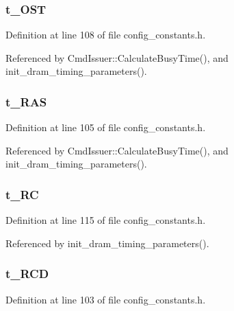 \subsubsection[{t\_\-OST}]{ {\bf t\_\-OST}}\label{config__constants_8h_635df1de31d54e4cb8777583366f4557}




Definition at line 108 of file config\_\-constants.h.

Referenced by CmdIssuer::CalculateBusyTime(), and init\_\-dram\_\-timing\_\-parameters().
\subsubsection[{t\_\-RAS}]{ {\bf t\_\-RAS}}\label{config__constants_8h_922b63d06cf57b48a984342835b4e871}




Definition at line 105 of file config\_\-constants.h.

Referenced by CmdIssuer::CalculateBusyTime(), and init\_\-dram\_\-timing\_\-parameters().
\subsubsection[{t\_\-RC}]{ {\bf t\_\-RC}}\label{config__constants_8h_0dca745437819ad187ed4fcac7620fbd}




Definition at line 115 of file config\_\-constants.h.

Referenced by init\_\-dram\_\-timing\_\-parameters().
\subsubsection[{t\_\-RCD}]{ {\bf t\_\-RCD}}\label{config__constants_8h_6230a7fc83ebdda3c94d2268a38194ed}




Definition at line 103 of file config\_\-constants.h.

